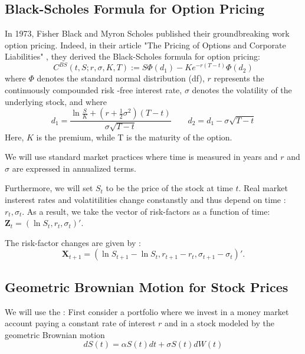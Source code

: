 \documentclass{article}
\begin{document}
\subsection*{Black-Scholes Formula for Option Pricing}
 In 1973, Fisher Black and Myron Scholes published their groundbreaking work option pricing. Indeed, in their article "The Pricing of Options and Corporate Liabilities" \cite{black1973pricing}, they derived the Black-Scholes formula for option pricing:
 \begin{equation}
    C^{BS}(t, S; r, \sigma, K, T) := S \Phi(d_1) - K e^{-r(T-t)} \Phi(d_2)
    \label{Black-Scholes Equation}
 \end{equation}
 where $\Phi$ denotes the standard normal distribution (df), $r$ represents the continuously compounded risk -free interest rate, $\sigma$ denotes the volatility of the underlying stock, and where 
  \begin{equation}
  d_1 = \frac{\ln\frac{S}{K} + (r+\frac{1}{2}\sigma^2)(T-t)}{\sigma \sqrt{T-t}} \qquad d_2 = d_1 - \sigma \sqrt{T-t}
    \label{d1, d2}
  \end{equation}
  Here, $K$ is the premium, while T is the maturity of the option. 

  We will use standard market practices where time is measured in years and $r$ and $\sigma$ are expressed in annualized terms.

  Furthermore, we will set $S_t$ to be the price of the stock at time $t$. Real market insterest rates and volatitilities change constanstly and thus depend on time : $ r_t, \sigma_t$. As a result, we take the vector of risk-factors as a function of time: $\textbf{Z}_t = (\ln S_t, r_t, \sigma_t)'$.

  The risk-factor changes are given by : 
  \begin{equation}
    \textbf{X}_{t+1} = (\ln S_{t+1} - \ln S_t, r_{t+1}-r_t, \sigma_{t+1} - \sigma_t)'.
    \label{BS: Risk-Factor Changes}
  \end{equation}

  \subsection*{Geometric Brownian Motion for Stock Prices}
    We will use the \cite{shreve2004stochastic} :
    First consider a portfolio where we invest in a money market account paying a constant rate of interest $r$ and in a stock modeled by the geometric Brownian motion
    \begin{equation}
      dS(t)= \alpha S(t) dt + \sigma S(t) dW(t)
      \label{Portfolio}
    \end{equation}
\end{document}
